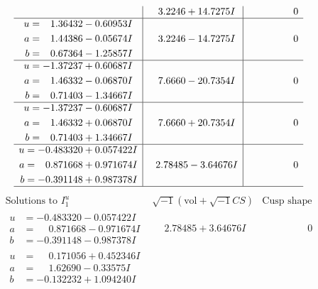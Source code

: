 \documentclass[1p]{elsarticle_modified}
\theoremstyle{definition}
\newcommand{\I}{\sqrt{-1}}
\begin{document}
$$\begin{array}{c|c|c}
 & \phantom{-}3.2246 + 14.7275 I & \phantom{-0.000000 } 0 \\ \hline\begin{aligned}
u &= \phantom{-}1.36432 - 0.60953 I \\
a &= \phantom{-}1.44386 - 0.05674 I \\
b &= \phantom{-}0.67364 - 1.25857 I\end{aligned}
 & \phantom{-}3.2246 - 14.7275 I & \phantom{-0.000000 } 0 \\ \hline\begin{aligned}
u &= -1.37237 + 0.60687 I \\
a &= \phantom{-}1.46332 - 0.06870 I \\
b &= \phantom{-}0.71403 - 1.34667 I\end{aligned}
 & \phantom{-}7.6660 - 20.7354 I & \phantom{-0.000000 } 0 \\ \hline\begin{aligned}
u &= -1.37237 - 0.60687 I \\
a &= \phantom{-}1.46332 + 0.06870 I \\
b &= \phantom{-}0.71403 + 1.34667 I\end{aligned}
 & \phantom{-}7.6660 + 20.7354 I & \phantom{-0.000000 } 0 \\ \hline\begin{aligned}
u &= -0.483320 + 0.057422 I \\
a &= \phantom{-}0.871668 + 0.971674 I \\
b &= -0.391148 + 0.987378 I\end{aligned}
 & \phantom{-}2.78485 - 3.64676 I & \phantom{-0.000000 } 0\\
 \hline 
 \end{array}$$\newpage$$\begin{array}{c|c|c}  
\text{Solutions to }I^u_{1}& \I (\text{vol} + \sqrt{-1}CS) & \text{Cusp shape}\\
 \hline 
\begin{aligned}
u &= -0.483320 - 0.057422 I \\
a &= \phantom{-}0.871668 - 0.971674 I \\
b &= -0.391148 - 0.987378 I\end{aligned}
 & \phantom{-}2.78485 + 3.64676 I & \phantom{-0.000000 } 0 \\ \hline\begin{aligned}
u &= \phantom{-}0.171056 + 0.452346 I \\
a &= \phantom{-}1.62690 - 0.33575 I \\
b &= -0.132232 + 1.094240 I\end{aligned}

\end{array}$$
\end{document}
